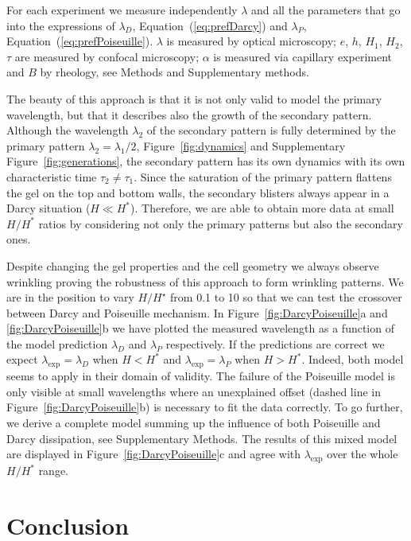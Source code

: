 \documentclass[twocolumn,superscriptaddress,showpacs,preprintnumbers,
amsmath,amssymb,prl]{revtex4-1}
\begin{document}
For each experiment we measure independently $\lambda$ and all the parameters that go into the expressions of $\lambda_D$, Equation~(\ref{eq:prefDarcy}) and $\lambda_P$, Equation~(\ref{eq:prefPoiseuille}). $\lambda$ is measured by optical microscopy; $e$, $h$, $H_1$, $H_2$, $\tau$ are measured by confocal microscopy; $\alpha$ is measured via capillary experiment and $B$ by rheology, see Methods and Supplementary methods.


The beauty of this approach is that it is not only valid to model the primary wavelength, but that it describes also the growth of the secondary pattern. Although the wavelength $\lambda_2$ of the secondary pattern is fully determined by the primary pattern $\lambda_2 = \lambda_1/2$, Figure~\ref{fig:dynamics} and Supplementary Figure~\ref{fig:generations}, the secondary pattern has its own dynamics with its own characteristic time $\tau_2\neq\tau_1$. Since the saturation of the primary pattern flattens the gel on the top and bottom walls, the secondary blisters always appear in a Darcy situation ($H\ll H^*$). Therefore, we are able to obtain more data at small $H/H^*$ ratios by considering not only the primary patterns but also the secondary ones.


Despite changing the gel properties and the cell geometry we always observe wrinkling proving the robustness of this approach to form wrinkling patterns. We are in the position to vary $H/H^\star$ from 0.1 to 10 so that we can test the crossover between Darcy and Poiseuille mechanism. In Figure~\ref{fig:DarcyPoiseuille}a and \ref{fig:DarcyPoiseuille}b we have plotted the measured wavelength as a function of the model prediction $\lambda_D$ and $\lambda_P$ respectively. If the predictions are correct we expect $\lambda_\text{exp}=\lambda_D$ when $H<H^*$ and $\lambda_\text{exp}=\lambda_P$ when $H>H^*$. Indeed, both model seems to apply in their domain of validity. The failure of the Poiseuille model is only visible at small wavelengths where an unexplained offset (dashed line in Figure~\ref{fig:DarcyPoiseuille}b) is necessary to fit the data correctly. To go further, we derive a complete model summing up the influence of both Poiseuille and Darcy dissipation, see Supplementary Methods. The results of this mixed model are displayed in Figure~\ref{fig:DarcyPoiseuille}c and agree with $\lambda_\text{exp}$ over the whole $H/H^*$ range.

\section*{Conclusion}
\end{document}
